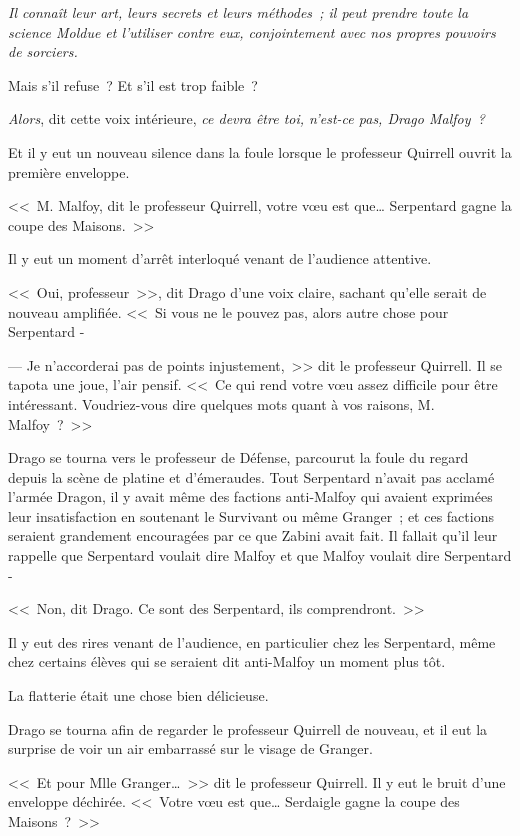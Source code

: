\emph{Il connaît leur art, leurs secrets et leurs méthodes~; il peut prendre toute la science Moldue et l'utiliser contre eux, conjointement avec nos propres pouvoirs de sorciers.}

Mais s'il refuse~? Et s'il est trop faible~?

\emph{Alors}, dit cette voix intérieure, \emph{ce devra être toi, n'est-ce pas, Drago Malfoy~?}

Et il y eut un nouveau silence dans la foule lorsque le professeur Quirrell ouvrit la première enveloppe.

<<~M. Malfoy, dit le professeur Quirrell, votre vœu est que… Serpentard gagne la coupe des Maisons.~>>

Il y eut un moment d'arrêt interloqué venant de l'audience attentive.

<<~Oui, professeur~>>, dit Drago d'une voix claire, sachant qu'elle serait de nouveau amplifiée. <<~Si vous ne le pouvez pas, alors autre chose pour Serpentard -

--- Je n'accorderai pas de points injustement,~>> dit le professeur Quirrell. Il se tapota une joue, l'air pensif. <<~Ce qui rend votre vœu assez difficile pour être intéressant. Voudriez-vous dire quelques mots quant à vos raisons, M. Malfoy~?~>>

Drago se tourna vers le professeur de Défense, parcourut la foule du regard depuis la scène de platine et d'émeraudes. Tout Serpentard n'avait pas acclamé l'armée Dragon, il y avait même des factions anti-Malfoy qui avaient exprimées leur insatisfaction en soutenant le Survivant ou même Granger~; et ces factions seraient grandement encouragées par ce que Zabini avait fait. Il fallait qu'il leur rappelle que Serpentard voulait dire Malfoy et que Malfoy voulait dire Serpentard -

<<~Non, dit Drago. Ce sont des Serpentard, ils comprendront.~>>

Il y eut des rires venant de l'audience, en particulier chez les Serpentard, même chez certains élèves qui se seraient dit anti-Malfoy un moment plus tôt.

La flatterie était une chose bien délicieuse.

Drago se tourna afin de regarder le professeur Quirrell de nouveau, et il eut la surprise de voir un air embarrassé sur le visage de Granger.

<<~Et pour Mlle Granger…~>> dit le professeur Quirrell. Il y eut le bruit d'une enveloppe déchirée. <<~Votre vœu est que… Serdaigle gagne la coupe des Maisons~?~>>

